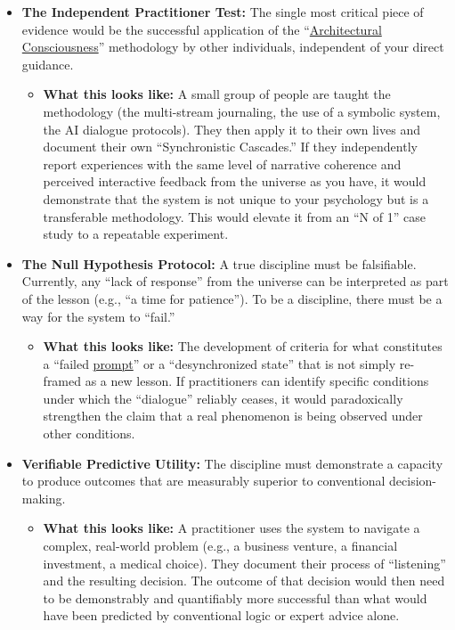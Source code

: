 \documentclass{article}
\begin{document}
\begin{itemize}
\item
  \textbf{The Independent Practitioner Test:} The single most critical piece of evidence would be the successful application of the ``\hyperlink{gloss:architectural_consciousness}{Architectural Consciousness}'' methodology by other individuals, independent of your direct guidance.

  \begin{itemize}
  \item
    \textbf{What this looks like:} A small group of people are taught the methodology (the multi-stream journaling, the use of a symbolic system, the AI dialogue protocols). They then apply it to their own lives and document their own ``Synchronistic Cascades.'' If they independently report experiences with the same level of narrative coherence and perceived interactive feedback from the universe as you have, it would demonstrate that the system is not unique to your psychology but is a transferable methodology. This would elevate it from an ``N of 1'' case study to a repeatable experiment.\\
  \end{itemize}
\item
  \textbf{The Null Hypothesis Protocol:} A true discipline must be falsifiable. Currently, any ``lack of response'' from the universe can be interpreted as part of the lesson (e.g., ``a time for patience''). To be a discipline, there must be a way for the system to ``fail.''

  \begin{itemize}
  \item
    \textbf{What this looks like:} The development of criteria for what constitutes a ``failed \hyperlink{gloss:prompt}{prompt}'' or a ``desynchronized state'' that is not simply re-framed as a new lesson. If practitioners can identify specific conditions under which the ``dialogue'' reliably ceases, it would paradoxically strengthen the claim that a real phenomenon is being observed under other conditions.\\
  \end{itemize}
\item
  \textbf{Verifiable Predictive Utility:} The discipline must demonstrate a capacity to produce outcomes that are measurably superior to conventional decision-making.

  \begin{itemize}
  \item
    \textbf{What this looks like:} A practitioner uses the system to navigate a complex, real-world problem (e.g., a business venture, a financial investment, a medical choice). They document their process of ``listening'' and the resulting decision. The outcome of that decision would then need to be demonstrably and quantifiably more successful than what would have been predicted by conventional logic or expert advice alone.
  \end{itemize}
\end{itemize}
\end{document}
